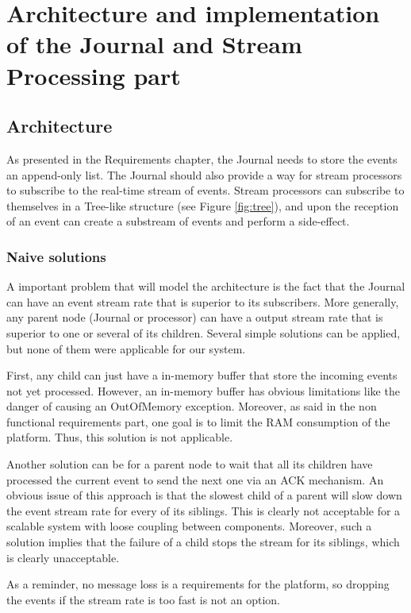 \chapter{Architecture and implementation of the Journal and Stream Processing part}

\section{Architecture}

As presented in the Requirements chapter, the Journal needs to store the events an append-only list. The Journal should also provide a way for stream processors to subscribe 
to the real-time stream of events. Stream processors can subscribe to themselves in a Tree-like structure (see Figure \ref{fig:tree}), and upon the reception of an event can create a substream of events and perform a side-effect.
\\

\subsection{Naive solutions}

A important problem that will model the architecture is the fact that the Journal can have an event stream rate that is superior to its subscribers. More generally,
any parent node (Journal or processor) can have a output stream rate that is superior to one or several of its children. 
Several simple solutions can be applied, but none of them were applicable for our system.

First, any child can just have a in-memory buffer that store the incoming events not yet processed. However, an in-memory buffer has obvious limitations like the danger
of causing an OutOfMemory exception. Moreover, as said in the non functional requirements part, one goal is to limit the RAM consumption of the platform. Thus, this solution is
not applicable.

Another solution can be for a parent node to wait that all its children have processed the current event to send the next one via an ACK mechanism. 
An obvious issue of this approach is that
the slowest child of a parent will slow down the event stream rate for every of its siblings. This is clearly not acceptable for a scalable system with loose coupling 
between components. Moreover, such a solution implies that the failure of a child stops the stream for its siblings, which is clearly unacceptable.

As a reminder, no message loss is a requirements for the platform, so dropping the events if the stream rate is too fast is not an option.
\\

